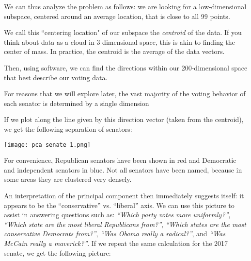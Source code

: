 \documentclass{ximera}
\begin{document}
We can thus analyze the 
problem as follows: we are looking for a low-dimensional subspace, centered around an average location, that is
close to all $99$ points. 

We call this ``centering location" of our subspace the \emph{centroid} of the data. If you think about data as a cloud in 3-dimensional space, this is akin to finding the center of mass. In practice, the centroid is the average of the data vectors. 

Then, using software, we can find the directions within our 200-dimensional space that best describe our voting data.


For reasons that we will explore later, the vast
majority of the voting behavior of each senator is determined by a
single dimension %


If we plot along the line given by this direction vector (taken from the centroid), we get the following separation of senators:

\begin{center}
  \texttt{[image: pca\_senate\_1.png]}
\end{center}

For convenience, Republican senators have been shown in red and
Democratic and independent senators in blue. Not all senators have
been named, because in some areas they are clustered very densely. 

An
interpretation of the principal component then immediately suggests
itself: it appears to be the ``conservative'' vs. ``liberal'' axis. We
can use this picture to assist in answering questions such as: {\em
  ``Which party votes more uniformly?''}, {\em ``Which state are the
  most liberal Republicans from?''}, {\em ``Which states are the most
  conservative Democrats from?''}, {\em ``Was Obama really a
  radical?''}, and {\em ``Was McCain really a maverick?''}.  If we
repeat the same calculation for the 2017 senate, we get the following
picture:
\end{document}
